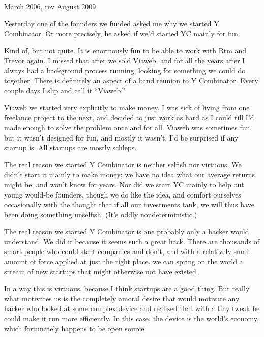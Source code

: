 March 2006, rev August 2009

Yesterday one of the founders we funded asked me why we started
\href{http://ycombinator.com}{Y Combinator}. Or more precisely, he asked
if we'd started YC mainly for fun.

Kind of, but not quite. It is enormously fun to be able to work with Rtm
and Trevor again. I missed that after we sold Viaweb, and for all the
years after I always had a background process running, looking for
something we could do together. There is definitely an aspect of a band
reunion to Y Combinator. Every couple days I slip and call it
``Viaweb.''

Viaweb we started very explicitly to make money. I was sick of living
from one freelance project to the next, and decided to just work as hard
as I could till I'd made enough to solve the problem once and for all.
Viaweb was sometimes fun, but it wasn't designed for fun, and mostly it
wasn't. I'd be surprised if any startup is. All startups are mostly
schleps.

The real reason we started Y Combinator is neither selfish nor virtuous.
We didn't start it mainly to make money; we have no idea what our
average returns might be, and won't know for years. Nor did we start YC
mainly to help out young would-be founders, though we do like the idea,
and comfort ourselves occasionally with the thought that if all our
investments tank, we will thus have been doing something unselfish.
(It's oddly nondeterministic.)

The real reason we started Y Combinator is one probably only a
\href{gba.html}{hacker} would understand. We did it because it seems
such a great hack. There are thousands of smart people who could start
companies and don't, and with a relatively small amount of force applied
at just the right place, we can spring on the world a stream of new
startups that might otherwise not have existed.

In a way this is virtuous, because I think startups are a good thing.
But really what motivates us is the completely amoral desire that would
motivate any hacker who looked at some complex device and realized that
with a tiny tweak he could make it run more efficiently. In this case,
the device is the world's economy, which fortunately happens to be open
source.
